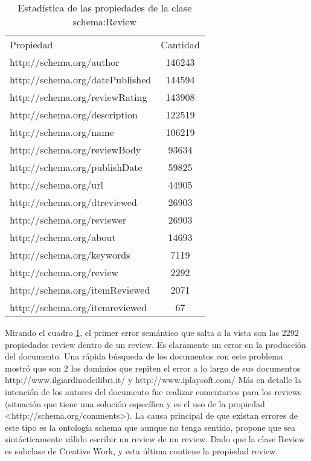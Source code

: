 \begin{table}[h]
\begin{tabular}{| l | c | }
 Propiedad & Cantidad \\
 http://schema.org/author & 146243 \\
 http://schema.org/datePublished & 144594 \\
 http://schema.org/reviewRating & 143908 \\
 http://schema.org/description & 122519 \\
 http://schema.org/name & 106219 \\
 http://schema.org/reviewBody & 93634 \\
 http://schema.org/publishDate & 59825 \\
 http://schema.org/url & 44905 \\
 http://schema.org/dtreviewed & 26903 \\
 http://schema.org/reviewer & 26903 \\
 http://schema.org/about & 14693 \\
 http://schema.org/keywords & 7119 \\
 http://schema.org/review & 2292 \\
 http://schema.org/itemReviewed & 2071 \\
 http://schema.org/itemreviewed & 67 
\end{tabular}
\caption{Estadística de las propiedades de la clase schema:Review}
\label{table:PropertiesStatisticsSchema}
\end{table}

 Mirando el cuadro \ref{table:PropertiesStatisticsSchema}, el primer error semántico que salta a la vista son las 2292 propiedades review dentro de un review. 
 Es claramente un error en la producción del documento. 
 Una rápida búsqueda de los documentos con este problema mostró que son 2 los dominios que repiten el error a lo largo de sus documentos
 http://www.ilgiardinodeilibri.it/ y http://www.iplaysoft.com/
 Más en detalle la intención de los autores del documento fue realizar comentarios para los reviews (situación que tiene una solución específica 
 y es el uso de la propiedad <http://schema.org/comments>). 
 La causa principal de que existan errores de este tipo es la ontología schema que aunque no tenga sentido, propone que sea sintácticamente válido
 escribir un review de un review. Dado que la clase Review es subclase de Creative Work, y esta última contiene la propiedad review.
 
